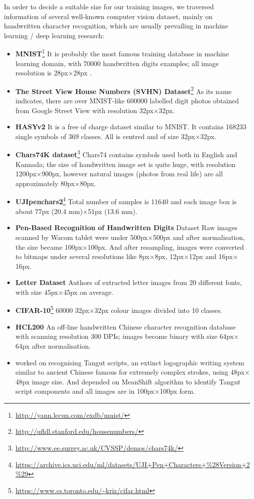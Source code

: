 In order to decide a suitable size for our training images, we traversed information of several well-known computer vision dataset, mainly on handwritten character recognition, which are usually prevailing in machine learning / deep learning research:
\begin{itemize}
	\item \textbf{MNIST}\footnote{\url{http://yann.lecun.com/exdb/mnist/}} It is probably the most famous training database in machine learning domain, with 70000 handwritten digits examples; all image resolution is 28px$ \times $28px .
	\item \textbf{The Street View House Numbers (SVHN) Dataset}\footnote{\url{http://ufldl.stanford.edu/housenumbers/}} As its name indicates, there are over MNIST-like 600000 labelled digit photos obtained from Google Street View with resolution 32px$ \times $32px\cite{netzer2011reading}.
	\item \textbf{HASYv2} It is a free of charge dataset similar to MNIST\cite{DBLP:journals/corr/Thoma17}. It contains 168233 single symbols of 369 classes. All is centred and of size 32px$ \times $32px.
	\item \textbf{Chars74K dataset}\footnote{\url{http://www.ee.surrey.ac.uk/CVSSP/demos/chars74k/}} Chars74 contains symbols used both in English and Kannada\cite{deCampos09}; the size of handwritten image set is quite huge, with resolution 1200px$ \times $900px, however natural images (photos from real life) are all approximately 80px$ \times $80px.
	\item \textbf{UJIpenchars2}\footnote{\url{https://archive.ics.uci.edu/ml/datasets/UJI+Pen+Characters+\%28Version+2\%29}} Total number of samples is 11640 and each image box is about 77px (20.4 mm)$ \times $51px (13.6 mm)\cite{llorens2008ujipenchars}.
	\item \textbf{Pen-Based Recognition of Handwritten Digits} Dataset Raw images scanned by Wacom tablet were under 500px$ \times $500px and after normalisation, the size became 100px$ \times $100px\cite{alimoglu1996combining}. And after resampling, images were converted to bitmaps under several resolutions like 8px$ \times $8px, 12px$ \times $12px and 16px$ \times $16px.
	\item \textbf{Letter Dataset} Authors of \cite{Frey1991} extracted letter images from 20 different fonts, with size 45px$ \times $45px on average.
	\item \textbf{CIFAR-10}\footnote{\url{https://www.cs.toronto.edu/~kriz/cifar.html}} 60000 32px$ \times $32px colour images divided into 10 classes.
	\item \textbf{HCL200} An off-line handwritten Chinese character recognition database with scanning resolution 300 DPIs; images become binary with size 64px$ \times $64px after normalisation\cite{zhang2009hcl2000}.
	\item \cite{men2011xixia} worked on recognising Tangut scripts, an extinct logographic writing system similar to ancient Chinese famous for extremely complex strokes, using 48px$ \times $48px image size. And \cite{yifei2017} depended on MeanShift algorithm to identify Tangut script components and all images are in 100px$ \times $100px form.
\end{itemize}


